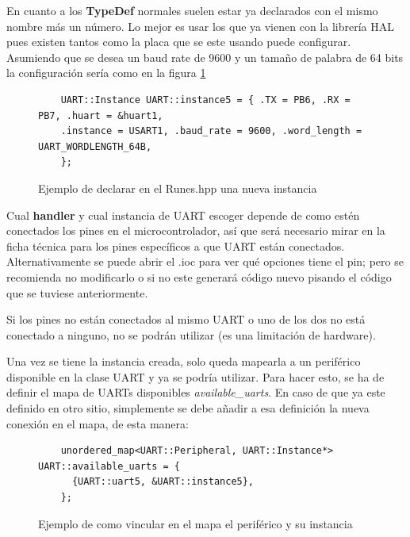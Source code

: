 \documentclass{report}
\begin{document}
En cuanto a los \textbf{TypeDef} normales suelen estar ya declarados con el mismo nombre más un número. Lo mejor es usar los que ya vienen con la librería HAL pues existen tantos como la placa que se este usando puede configurar. Asumiendo que se desea un baud rate de 9600 y un tamaño de palabra de 64 bits la configuración sería como en la figura \ref{UARTinstanceRunes}

\begin{figure}[h]
  \begin{lstlisting}
    UART::Instance UART::instance5 = { .TX = PB6, .RX = PB7, .huart = &huart1,
    .instance = USART1, .baud_rate = 9600, .word_length = UART_WORDLENGTH_64B,
    };
  \end{lstlisting}
\caption{Ejemplo de declarar en el Runes.hpp una nueva instancia}
\label{UARTinstanceRunes}
\end{figure}
\par \vspace{0.3cm}

Cual \textbf{handler} y cual instancia de UART escoger depende de como estén conectados los pines en el microcontrolador, así que será necesario mirar en la ficha técnica para los pines específicos a que UART están conectados. Alternativamente se puede abrir el .ioc para ver qué opciones tiene el pin; pero se recomienda no modificarlo o si no este generará código nuevo pisando el código que se tuviese anteriormente. 
\par 
Si los pines no están conectados al mismo UART o uno de los dos no está conectado a ninguno, no se podrán utilizar (es una limitación de hardware).  
\par \vspace{0.3cm}
Una vez se tiene la instancia creada, solo queda mapearla a un periférico disponible en la clase UART y ya se podría utilizar. Para hacer esto, se ha de definir el mapa de UARTs disponibles \textit{available\_uarts}. En caso de que ya este definido en otro sitio, simplemente se debe añadir a esa definición la nueva conexión en el mapa, de esta manera: 

\begin{figure}[h]
  \begin{lstlisting}
    unordered_map<UART::Peripheral, UART::Instance*> UART::available_uarts = {
      {UART::uart5, &UART::instance5},
    };
  \end{lstlisting}
\caption{Ejemplo de como vincular en el mapa el periférico y su instancia}
\label{UARTavailableMap}
\end{figure}
\par \vspace{0.3cm}
\end{document}
